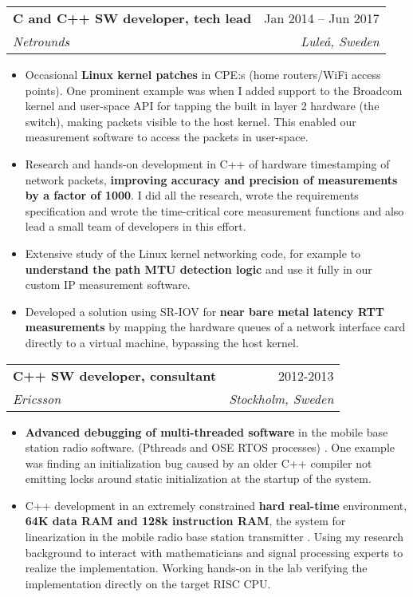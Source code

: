 \documentclass[a4paper,11pt]{article}
\makeatletter
\newcommand{\resumeItem}[1]{
  \item\small{#1}
}
\newcommand{\resumeItemListStart}{\begin{itemize}[rightmargin=0.11in]}
\newcommand{\resumeItemListEnd}{\end{itemize}}
\newcommand{\resumeQuadHeading}[4]{
  \item
  \begin{tabular*}{0.96\textwidth}[t]{l@{\extracolsep{\fill}}r}
    \textbf{#1} & #2 \\
    \textit{\small#3} & \textit{\small #4} \\
  \end{tabular*}
}
\makeatother
\begin{document}
\resumeQuadHeading{C and C++ SW developer, tech lead}{Jan 2014 -- Jun 2017}
  {Netrounds}{Luleå, Sweden}    %
    \resumeItemListStart{}
      \resumeItem{Occasional \textbf{Linux kernel patches} in CPE:s (home routers/WiFi access points).} One prominent example was when I added support to the Broadcom kernel and user-space API for tapping the built in layer 2 hardware (the switch), making packets visible to the host kernel. This enabled our measurement software to access the packets in user-space.
      \resumeItem{Research and hands-on development in C++ of hardware timestamping of network packets, \textbf{improving accuracy and precision of measurements by a factor of 1000}. I did all the research, wrote the requirements specification and wrote the time-critical core measurement functions and also lead a small team of developers in this effort.}
      \resumeItem{Extensive study of the Linux kernel networking code, for example to \textbf{understand the path MTU detection logic} and use it fully in our custom IP measurement software.}
      \resumeItem{Developed a solution using SR-IOV for \textbf{near bare metal latency RTT measurements} by mapping the hardware queues of a network interface card directly to a virtual machine, bypassing the host kernel.}
    \resumeItemListEnd{}

\resumeQuadHeading{C++ SW developer, consultant}{2012-2013}
  {Ericsson}{Stockholm, Sweden}
    \resumeItemListStart{}
      \resumeItem{\textbf{Advanced debugging of multi-threaded software} in the mobile base station radio software. (Pthreads and OSE RTOS processes)}. One example was finding an initialization bug caused by an older C++ compiler not emitting locks around static initialization at the startup of the system.
      \resumeItem{C++ development in an extremely constrained \textbf{hard real-time} environment, \textbf{64K data RAM and 128k instruction RAM}, the system for linearization in the mobile radio base station transmitter}. Using my research background to interact with mathematicians and signal processing experts to realize the implementation. Working hands-on in the lab verifying the implementation directly on the target RISC CPU.
    \resumeItemListEnd{}
\end{document}
